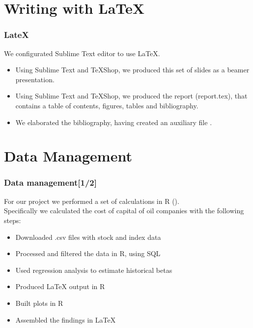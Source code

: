 \documentclass {beamer}
\begin{document}
\section{Writing with LaTeX}
\begin{frame}
\frametitle{LateX}
We configurated Sublime Text editor to use LaTeX.\\
\begin{itemize}
\item Using Sublime Text and TeXShop, we produced this set of slides as a beamer presentation.
\item Using Sublime Text and TeXShop, we produced the report (report.tex), that contains a table of contents, figures, tables and bibliography.
\item We elaborated the bibliography, having created an auxiliary file .
\end{itemize}

\end{frame}

\section{Data Management}
\begin{frame}
\frametitle{Data management[1/2]}
For our project we performed a set of calculations in R ().\\
Specifically we calculated the cost of capital of oil companies with the following steps:
\begin{itemize}
\item Downloaded .csv files with stock and index data
\item Processed and filtered the data in R, using SQL
\item Used regression analysis to estimate historical betas
\item Produced LaTeX output in R
\item Built plots in R
\item Assembled the findings in LaTeX
\end{itemize}
\end{frame}
\end{document}
